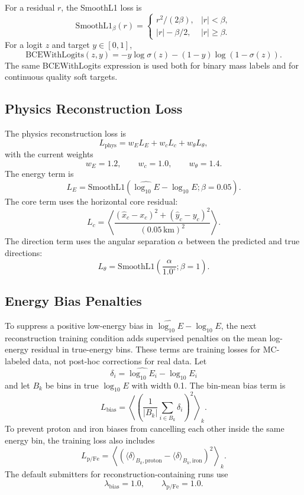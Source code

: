 \documentclass[a4paper,10pt]{article}
\begin{document}
For a residual $r$, the SmoothL1 loss is
\[
  \mathrm{SmoothL1}_{\beta}(r)=
  \begin{cases}
    r^2/(2\beta), & |r|<\beta,\\
    |r|-\beta/2, & |r|\ge\beta.
  \end{cases}
\]
For a logit $z$ and target $y\in[0,1]$,
\[
  \mathrm{BCEWithLogits}(z,y)
  =
  -y\log\sigma(z)-(1-y)\log(1-\sigma(z)).
\]
The same BCEWithLogits expression is used both for binary mass labels and for continuous quality soft targets.

\subsection{Physics Reconstruction Loss}

The physics reconstruction loss is
\[
  L_{\mathrm{phys}} =
  w_E L_E + w_c L_c + w_\theta L_\theta,
\]
with the current weights
\[
  w_E=1.2,\qquad w_c=1.0,\qquad w_\theta=1.4.
\]
The energy term is
\[
  L_E=
  \mathrm{SmoothL1}(\widehat{\log_{10}E}-\log_{10}E;\beta=0.05).
\]
The core term uses the horizontal core residual:
\[
  L_c=
  \left\langle
  \frac{(\hat{x}_c-x_c)^2+(\hat{y}_c-y_c)^2}
       {(0.05\,\mathrm{km})^2}
  \right\rangle.
\]
The direction term uses the angular separation $\alpha$ between the predicted and true directions:
\[
  L_\theta=
  \mathrm{SmoothL1}\left(\frac{\alpha}{1.0^\circ};\beta=1\right).
\]

\subsection{Energy Bias Penalties}

To suppress a positive low-energy bias in
$\widehat{\log_{10}E}-\log_{10}E$, the next reconstruction training condition
adds supervised penalties on the mean log-energy residual in true-energy bins.
These terms are training losses for MC-labeled data, not post-hoc corrections for real data.
Let
\[
  \delta_i=\widehat{\log_{10}E_i}-\log_{10}E_i
\]
and let $B_k$ be bins in true $\log_{10}E$ with width 0.1. The bin-mean bias term is
\[
  L_{\mathrm{bias}}=
  \left\langle
  \left(
  \frac{1}{|B_k|}\sum_{i\in B_k}\delta_i
  \right)^2
  \right\rangle_k .
\]
To prevent proton and iron biases from cancelling each other inside the same energy bin, the training loss also includes
\[
  L_{\mathrm{p/Fe}}=
  \left\langle
  \left(
  \langle\delta\rangle_{B_k,\mathrm{proton}}
  -
  \langle\delta\rangle_{B_k,\mathrm{iron}}
  \right)^2
  \right\rangle_k .
\]
The default submitters for reconstruction-containing runs use
\[
  \lambda_{\mathrm{bias}}=1.0,\qquad
  \lambda_{\mathrm{p/Fe}}=1.0.
\]
\end{document}
